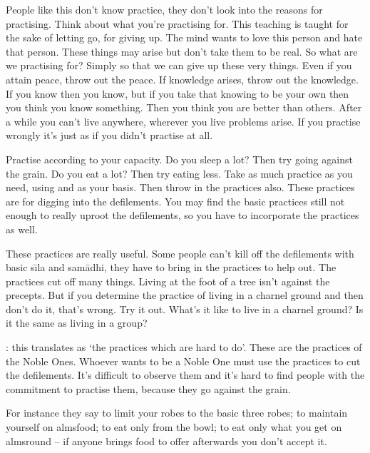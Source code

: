 People like this don't know practice, they don't look into the reasons for practising. Think about what you're practising for. This teaching is taught for the sake of letting go, for giving up. The mind wants to love this person and hate that person. These things may arise but don't take them to be real. So what are we practising for? Simply so that we can give up these very things. Even if you attain peace, throw out the peace. If knowledge arises, throw out the knowledge. If you know then you know, but if you take that knowing to be your own then you think you know something. Then you think you are better than others. After a while you can't live anywhere, wherever you live problems arise. If you practise wrongly it's just as if you didn't practise at all. 

Practise according to your capacity. Do you sleep a lot? Then try going against the grain. Do you eat a lot? Then try eating less. Take as much practice as you need, using   and  as your basis. Then throw in the  practices also. These  practices are for digging into the defilements. You may find the basic practices still not enough to really uproot the defilements, so you have to incorporate the  practices as well. 

These  practices are really useful. Some people can't kill off the defilements with basic s\={\i}la and sam\=adhi, they have to bring in the  practices to help out. The  practices cut off many things.  Living at the foot of a tree isn't against the precepts. But if you determine the  practice of living in a charnel ground and then don't do it, that's wrong. Try it out. What's it like to live in a charnel ground? Is it the same as living in a group? 

: this translates as `the practices which are hard to do'. These are the practices of the Noble Ones. Whoever wants to be a Noble One must use the  practices to cut the defilements. It's difficult to observe them and it's hard to find people with the commitment to practise them, because they go against the grain. 

For instance they say to limit your robes to the basic three robes; to maintain yourself on almsfood; to eat only from the bowl; to eat only what you get on almsround -- if anyone brings food to offer afterwards you don't accept it. 

